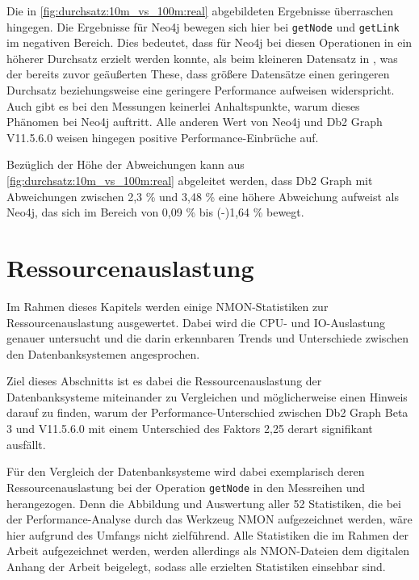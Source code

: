 Die in \autoref{fig:durchsatz:10m_vs_100m:real} abgebildeten Ergebnisse überraschen hingegen. Die Ergebnisse für Neo4j bewegen sich hier bei \texttt{getNode} und \texttt{getLink} im negativen Bereich. Dies bedeutet, dass für Neo4j bei diesen Operationen in  ein höherer Durchsatz erzielt werden konnte, als beim kleineren Datensatz in , was der bereits zuvor geäußerten These, dass größere Datensätze einen geringeren Durchsatz beziehungsweise eine geringere Performance aufweisen widerspricht. Auch gibt es bei den Messungen keinerlei Anhaltspunkte, warum dieses Phänomen bei Neo4j auftritt. Alle anderen Wert von Neo4j und Db2 Graph V11.5.6.0 weisen hingegen positive Performance-Einbrüche auf.

Bezüglich der Höhe der Abweichungen kann aus \autoref{fig:durchsatz:10m_vs_100m:real} abgeleitet werden, dass Db2 Graph mit Abweichungen zwischen 2,3 \% und 3,48 \% eine höhere Abweichung aufweist als Neo4j, das sich im Bereich von 0,09 \% bis (-)1,64 \% bewegt. 

\section{Ressourcenauslastung}
\label{auswertung:ressourcenauslastung}

Im Rahmen dieses Kapitels werden einige NMON-Statistiken zur Ressourcenauslastung ausgewertet. Dabei wird die CPU- und IO-Aus\-last\-ung genauer untersucht und die darin erkennbaren Trends und Unterschiede zwischen den Datenbanksystemen angesprochen. 

Ziel dieses Abschnitts ist es dabei die Ressourcenauslastung der Datenbanksysteme miteinander zu Vergleichen und möglicherweise einen Hinweis darauf zu finden, warum der Performance-Unterschied zwischen Db2 Graph Beta 3 und V11.5.6.0 mit einem Unterschied des Faktors 2,25 derart signifikant ausfällt. 

Für den Vergleich der Datenbanksysteme wird dabei exemplarisch deren Ressourcenauslastung bei der Operation \texttt{getNode} in den Messreihen  und  herangezogen. Denn die Abbildung und Auswertung aller 52 Statistiken, die bei der Performance-Analyse durch das Werkzeug NMON aufgezeichnet werden, wäre hier aufgrund des Umfangs nicht zielführend. Alle Statistiken die im Rahmen der Arbeit aufgezeichnet werden, werden allerdings als NMON-Dateien dem digitalen Anhang der Arbeit beigelegt, sodass alle erzielten Statistiken einsehbar sind.

